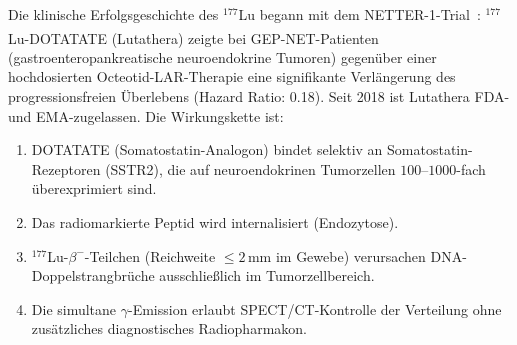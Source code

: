 ﻿\documentclass[12pt, a4paper]{report}
\theoremstyle{definition}
\theoremstyle{remark}
\begin{document}
Die klinische Erfolgsgeschichte des $^{177}$Lu begann mit dem
NETTER-1-Trial~\cite{strosberg2017}: $^{177}$Lu-DOTATATE (Lutathera\textsuperscript{\textregistered})
zeigte bei GEP-NET-Patienten (gastroenteropankreatische neuroendokrine Tumoren)
gegenüber einer hochdosierten Octeotid-LAR-Therapie eine signifikante
Verlängerung des progressionsfreien Überlebens (Hazard Ratio: 0.18). Seit
2018 ist Lutathera FDA- und EMA-zugelassen. Die Wirkungskette ist:
\begin{enumerate}[label=\arabic*.]
  \item DOTATATE (Somatostatin-Analogon) bindet selektiv an Somatostatin-Rezeptoren
        (SSTR2), die auf neuroendokrinen Tumorzellen $100$--$1000$-fach
        überexprimiert sind.
  \item Das radiomarkierte Peptid wird internalisiert (Endozytose).
  \item $^{177}$Lu-$\beta^-$-Teilchen (Reichweite $\leq 2\,\text{mm}$ im Gewebe)
        verursachen DNA-Doppelstrang\-brüche ausschließlich im Tumorzellbereich.
  \item Die simultane $\gamma$-Emission erlaubt SPECT/CT-Kontrolle der
        Verteilung ohne zusätzliches diagnostisches Radiopharmakon.
\end{enumerate}
\end{document}
